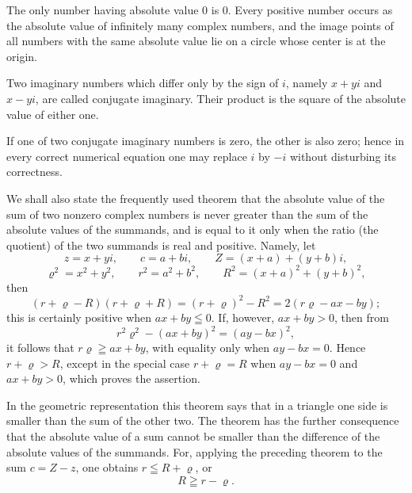 
The only number having absolute value $0$ is $0$. Every positive
number occurs as the absolute value of infinitely many complex
numbers, and the image points of all numbers with the same absolute
value lie on a circle whose center is at the origin.

Two imaginary numbers which differ only by the sign of $i$, namely
$x+yi$ and $x-yi$, are called conjugate imaginary. Their product is
the square of the absolute value of either one.

If one of two conjugate imaginary numbers is zero, the other is also
zero; hence in every correct numerical equation one may replace $i$
by $-i$ without disturbing its correctness.

We shall also state the frequently used theorem that the absolute
value of the sum of two nonzero complex numbers is never greater than
the sum of the absolute values of the summands, and is equal to it only
when the ratio (the quotient) of the two summands is real and positive.
Namely, let
\[
 z=x+yi,
 \qquad c=a+bi,
 \qquad Z=(x+a)+(y+b)i,
\]
\[
 \varrho^2=x^2+y^2,
 \qquad r^2=a^2+b^2,
 \qquad R^2=(x+a)^2+(y+b)^2,
\]
then
\[
 (r+\varrho-R)(r+\varrho+R)
   =(r+\varrho)^2-R^2=2(r\varrho-ax-by);
\]
this is certainly positive when $ax+by\leqq 0$. If, however,
$ax+by>0$, then from
\[
 r^2\varrho^2-(ax+by)^2=(ay-bx)^2,
\]
it follows that $r\varrho\geqq ax+by$, with equality only when
$ay-bx=0$. Hence $r+\varrho>R$, except in the special case
$r+\varrho=R$ when $ay-bx=0$ and $ax+by>0$, which proves the
assertion.

In the geometric representation this theorem says that in a triangle
one side is smaller than the sum of the other two. The theorem has the
further consequence that the absolute value of a sum cannot be smaller
than the difference of the absolute values of the summands. For,
applying the preceding theorem to the sum $c=Z-z$, one obtains
$r\leqq R+\varrho$, or
\[
 R\geqq r-\varrho.
\]
